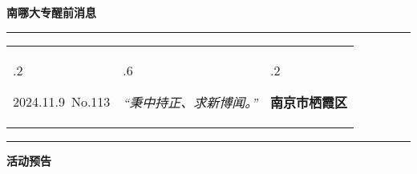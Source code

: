 \documentclass[letterpaper, 12pt]{article}
\begin{document}
\begin{center}
    \Huge\textbf{南哪大专醒前消息}
\end{center}
\vspace{4mm}
\hrule
\renewcommand\tabularxcolumn[1]{m{#1}}
\begin{tabularx}{\textwidth}{>{\hsize.2\hsize}X>{\hsize.6\hsize}X>{\hsize.2\hsize}X}
    \begin{flushleft}
        2024.11.9\, No.113
    \end{flushleft}
    &
    \begin{center}
        \textit{“秉中持正、求新博闻。”}
    \end{center}
    &
    \begin{flushright}
        \textbf{南京市栖霞区}
    \end{flushright}
\end{tabularx}
\vspace{-3.5mm}
\hrule
\vspace{4mm}
\centerline{\huge\textbf{活动预告}}
\end{document}
